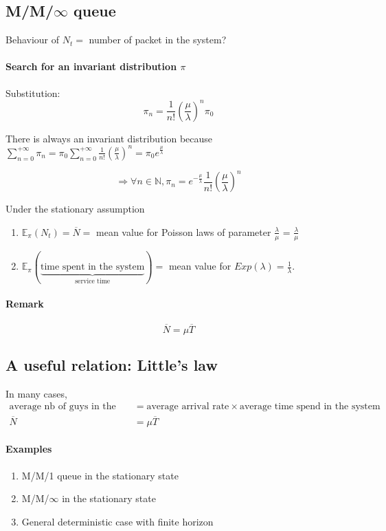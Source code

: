 \documentclass{article}
\begin{document}
\subsection{M/M/$\infty$ queue}
Behaviour of $N_t=$ number of packet in the system?

\paragraph{Search for an invariant distribution $\pi$}
Substitution:
\[\pi_n=\frac{1}{n!}\left( \frac{\mu}{\lambda} \right) ^n \pi_0\]

There is always an invariant distribution because $\sum_{n=0}^{+\infty} \pi_n = \pi_0\sum_{n=0}^{+\infty}\frac{1}{n!}\left(\frac{\mu}{\lambda}\right)^n=\pi_0 e^{\frac{\mu}{\lambda}}$

\[\Rightarrow \forall n \in \mathbb{N}, \pi_n = e^{-\frac{\mu}{\lambda}}\frac{1}{n!}\left( \frac{\mu}{\lambda}\right) ^n\]

Under the stationary assumption
\begin{enumerate}
\item $\mathbb{E}_\pi (N_t)= \overline{N} = $ mean value for Poisson laws of parameter $\frac{\lambda}{\mu}$ = $\frac{\lambda}{\mu}$
\item $\mathbb{E}_\pi(\underbrace{\text{time spent in the system}}_{\text{service time}})=$ mean value for $Exp(\lambda)=\frac{1}{\lambda}$.
\end{enumerate}

\paragraph{Remark}
\[\overline{N}=\mu \overline{T}\]


\subsection*{A useful relation: Little's law}

In many cases,
\begin{align*}
\text{average nb of guys in the system} &= \text{average arrival rate} \times \text{average time spend in the system}\\
\overline{N} & =\mu \overline{T}
\end{align*}



\paragraph{Examples}
\begin{enumerate}
\item M/M/1 queue in the stationary state
\item M/M/$\infty$ in the stationary state
\item General deterministic case with finite horizon
\end{enumerate}
\end{document}
